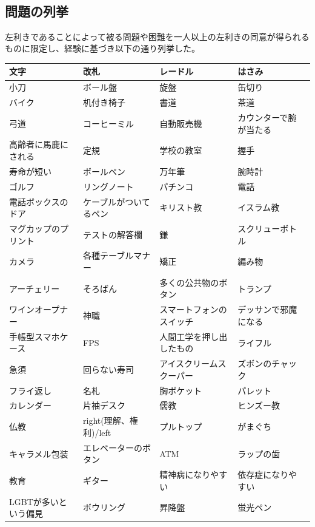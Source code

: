 \documentclass{jsarticle}
\begin{document}
　
\newpage
\subsection{問題の列挙}

左利きであることによって被る問題や困難を一人以上の左利きの同意が得られるものに限定し、経験に基づき以下の通り列挙した。

\begin{table}[H]
  \begin{tabular}{|l|l|l|l|l|}\hline
  文字 & 改札 &  レードル &  はさみ \\ \hline
  小刀 &ボール盤 &  旋盤 &  缶切り \\\hline
  バイク &  机付き椅子 &  書道 &  茶道\\\hline
  弓道 &  コーヒーミル &  自動販売機 &  カウンターで腕が当たる\\\hline
  高齢者に馬鹿にされる &  定規 &  学校の教室 &  握手 \\\hline
  寿命が短い &  ボールペン &  万年筆 &  腕時計\\\hline
  ゴルフ &  リングノート &  パチンコ &  電話 \\\hline
  電話ボックスのドア &  ケーブルがついてるペン &  キリスト教 &  イスラム教 \\\hline
  マグカップのプリント &  テストの解答欄 &  鎌 &スクリューボトル \\\hline
  カメラ &  各種テーブルマナー &  矯正 &  編み物 \\\hline
  アーチェリー &  そろばん &  多くの公共物のボタン &  トランプ \\\hline
  ワインオープナー &  神職 &  スマートフォンのスイッチ &  デッサンで邪魔になる \\\hline
  手帳型スマホケース &  FPS &  人間工学を押し出したもの &  ライフル \\\hline
  急須 &  回らない寿司 &  アイスクリームスクーパー &  ズボンのチャック\\\hline
  フライ返し &  名札 &  胸ポケット &  パレット \\\hline
  カレンダー &  片袖デスク &  儒教 &  ヒンズー教 \\\hline
  仏教 &  right(理解、権利)/left &  プルトップ &  がまぐち \\\hline
  キャラメル包装 &  エレベーターのボタン &  ATM &  ラップの歯 \\\hline
  教育 &  ギター &  精神病になりやすい &  依存症になりやすい \\\hline
  LGBTが多いという偏見 &  ボウリング &  昇降盤 &  蛍光ペン \\\hline

\end{tabular}
\end{table}
\end{document}
